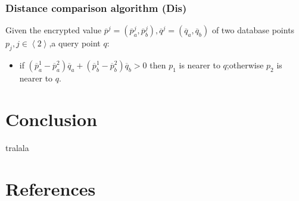 \documentclass[12pt,english,hidelinks]{article}
\begin{document}
\subsubsection{Distance comparison algorithm (Dis)}
Given the encrypted value $\overline{p}^{j} = \left ( \overline{p}^{j}_{a}, \overline{p}^{j}_{b}\right ),\overline{q}^{j} = \left ( \overline{q}_{a}, \overline{q}_{b}\right )$ of two database points $p_j,j\in \left \langle 2 \right \rangle$,a query point $q$:
\begin{itemize}
\item if $\left ( \overline{p}_{a}^{1} - \overline{p}_{a}^{2} \right )\overline{q}_{a}
+ \left ( \overline{p}_{b}^{1} - \overline{p}_{b}^{2} \right )\overline{q}_{b} > 0$ then $p_1$ is nearer to $q$;otherwise $p_2$ is nearer to $q$.
\end{itemize}
\section{Conclusion}

\bigskip{}
tralala



\pagebreak{}

\section{References}
\end{document}
